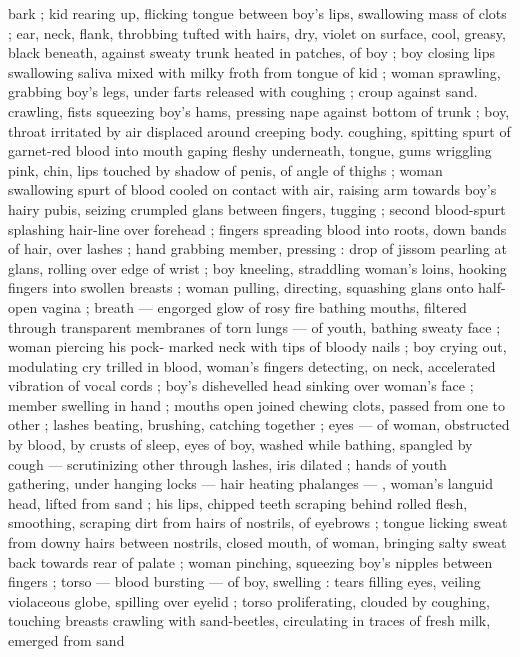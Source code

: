 bark ; kid rearing up, flicking tongue between boy's lips, swallowing 
mass of clots ; ear, neck, flank, throbbing tufted with hairs, dry, violet 
on surface, cool, greasy, black beneath, against sweaty trunk heated 
in patches, of boy ; boy closing lips swallowing saliva mixed with 
milky froth from tongue of kid ; woman sprawling, grabbing boy's 
legs, under farts released with coughing ; croup against sand. 
crawling, fists squeezing boy's hams, pressing nape against bottom 
of trunk ; boy, throat irritated by air displaced around creeping body. 
coughing, spitting spurt of garnet-red blood into mouth gaping 
fleshy underneath, tongue, gums wriggling pink, chin, lips touched 
by shadow of penis, of angle of thighs ; woman swallowing spurt of 
blood cooled on contact with air, raising arm towards boy's hairy 
pubis, seizing crumpled glans between fingers, tugging ; second 
blood-spurt splashing hair-line over forehead ; fingers spreading 
blood into roots, down bands of hair, over lashes ; hand grabbing 
member, pressing : drop of jissom pearling at glans, rolling over 
edge of wrist ; boy kneeling, straddling woman's loins, hooking 
fingers into swollen breasts ; woman pulling, directing, squashing 
glans onto half-open vagina ; breath --- engorged glow of rosy fire 
bathing mouths, filtered through transparent membranes of torn 
lungs --- of youth, bathing sweaty face ; woman piercing his pock- 
marked neck with tips of bloody nails ; boy crying out, modulating 
cry trilled in blood, woman's fingers detecting, on neck, accelerated 
vibration of vocal cords ; boy's dishevelled head sinking over 
woman's face ; member swelling in hand ; mouths open joined 
chewing clots, passed from one to other ; lashes beating, brushing, 
catching together ; eyes --- of woman, obstructed by blood, by 
crusts of sleep, eyes of boy, washed while bathing, spangled by 
cough --- scrutinizing other through lashes, iris dilated ; hands of 
youth gathering, under hanging locks --- hair heating phalanges --- 
, woman's languid head, lifted from sand ; his lips, chipped teeth 
scraping behind rolled flesh, smoothing, scraping dirt from hairs of 
nostrils, of eyebrows ; tongue licking sweat from downy hairs 
between nostrils, closed mouth, of woman, bringing salty sweat back 
towards rear of palate ; woman pinching, squeezing boy's nipples 
between fingers ; torso --- blood bursting --- of boy, swelling : tears 
filling eyes, veiling violaceous globe, spilling over eyelid ; torso 
proliferating, clouded by coughing, touching breasts crawling with 
sand-beetles, circulating in traces of fresh milk, emerged from sand 
